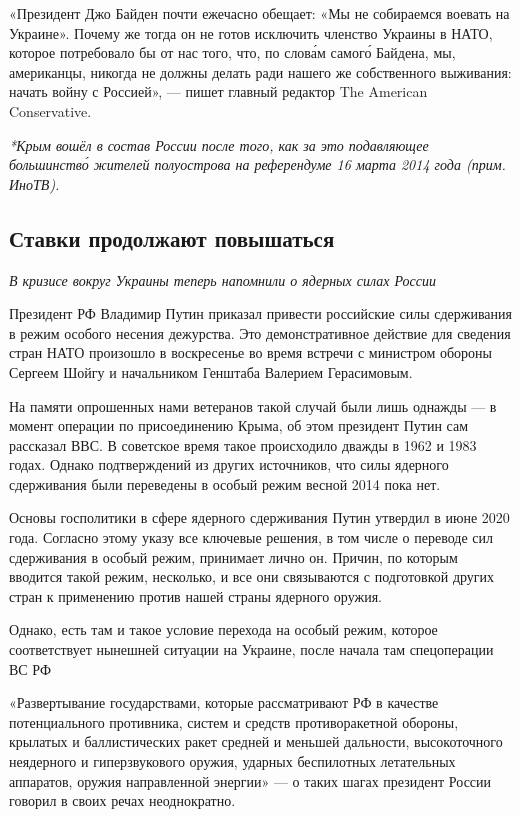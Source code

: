 \begin{fancyquotes}
    «Президент Джо Байден почти ежечасно обещает: «Мы не собираемся воевать на Украине». Почему же тогда он не готов исключить членство Украины в НАТО, которое потребовало бы от нас того, что, по слов\'{а}м самог\'{о} Байдена, мы, американцы, никогда не должны делать ради нашего же собственного выживания: начать войну с Россией», --- пишет главный редактор The American Conservative.
\end{fancyquotes}

\textit{*Крым вошёл в состав России после того, как за это  подавляющее большинств\'{о} жителей полуострова на референдуме 16 марта 2014 года (прим. ИноТВ).}




\subsection{Ставки продолжают повышаться}

\textit{В кризисе вокруг Украины теперь напомнили о ядерных силах России}

Президент РФ Владимир Путин приказал привести российские силы сдерживания в режим особого несения дежурства. Это демонстративное действие для сведения стран НАТО произошло в воскресенье во время встречи с министром обороны Сергеем Шойгу и начальником Генштаба Валерием Герасимовым.

На памяти опрошенных нами ветеранов такой случай были лишь однажды — в момент операции по присоединению Крыма, об этом президент Путин сам рассказал ВВС. В советское время такое происходило дважды в 1962 и 1983 годах. Однако подтверждений из других источников, что силы ядерного сдерживания были переведены в особый режим весной 2014 пока нет.

Основы госполитики в сфере ядерного сдерживания Путин утвердил в июне 2020 года. Согласно этому указу все ключевые решения, в том числе о переводе сил сдерживания в особый режим, принимает лично он. Причин, по которым вводится такой режим, несколько, и все они связываются с подготовкой других стран к применению против нашей страны ядерного оружия.


Однако, есть там и такое условие перехода на особый режим, которое соответствует нынешней ситуации на Украине, после начала там спецоперации ВС РФ


\begin{fancyquotes}
    «Развертывание государствами, которые рассматривают РФ в качестве потенциального противника, систем и средств противоракетной обороны, крылатых и баллистических ракет средней и меньшей дальности, высокоточного неядерного и гиперзвукового оружия, ударных беспилотных летательных аппаратов, оружия направленной энергии» — о таких шагах президент России говорил в своих речах неоднократно.
\end{fancyquotes}

